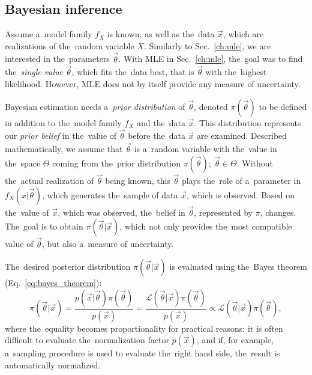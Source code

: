 \subsection{Bayesian inference}

Assume a~model family $f_X$ is known, as well as the~data $\vec{x}$, which are realizations of the~random variable $X$. Similarly to Sec.~\ref{ch:mle}, we are interested in the~parameters $\vec{\theta}$. With MLE in Sec.~\ref{ch:mle}, the~goal was to find the~\textit{single value} $\vec{\theta}$, which fits the~data best, that is $\vec{\theta}$ with the~highest likelihood. However, MLE does not by itself provide any measure of uncertainty. 

Bayesian estimation needs a~\textit{prior distribution} of $\vec{\theta}$, denoted $\pi(\vec{\theta})$ to be defined in addition to the~model family $f_X$ and the~data $\vec{x}$. This distribution represents our \textit{prior belief} in the~value of $\vec{\theta}$ before the~data $\vec{x}$ are examined. Described mathematically, we assume that $\vec{\theta}$ is a~random variable with the~value in the~space $\Theta$ coming from the~prior distribution $\pi(\vec{\theta}); \ \vec{\theta} \in \Theta$. Without the~actual realization of $\vec{\theta}$ being known, this $\vec{\theta}$ plays the~role of a~parameter in $f_X(x|\vec{\theta})$, which generates the~sample of data $\vec{x}$, which is observed. Based on the~value of $\vec{x}$, which was observed, the~belief in $\vec{\theta}$, represented by $\pi$, changes. The~goal is to obtain $\pi(\vec{\theta}|\vec{x})$, which not only provides the~most compatible value of $\vec{\theta}$, but also a~measure of uncertainty. 

The~desired posterior distribution $\pi(\vec{\theta}|\vec{x})$ is evaluated using the~Bayes theorem (Eq.~\ref{eq:bayes_theorem}):
\begin{equation}
    \pi(\vec{\theta}|\vec{x}) = \frac{p(\vec{x}|\vec{\theta}) \pi(\vec{\theta})}{p(\vec{x})} = \frac{\mathcal{L}(\vec{\theta}|\vec{x}) \pi(\vec{\theta})}{p(\vec{x})} \propto \mathcal{L}(\vec{\theta}|\vec{x}) \pi(\vec{\theta}),
    \label{eq:bayesian_inference}
\end{equation}
where the~equality becomes proportionality for practical reasons: it is often difficult to evaluate the~normalization factor $p(\vec{x})$, and if, for example, a~sampling procedure is used to evaluate the~right hand side, the~result is automatically normalized. 

